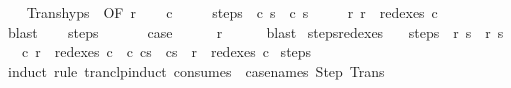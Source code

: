 \begin{isabellebody}
\ \ \isamarkupfalse%
\ Trans{\isachardot}hyps\ {\isacharparenleft}{}{\isacharparenright}\ {\isacharbrackleft}OF\ r{\isacharprime}{\isacharprime}{\isacharbrackright}\isanewline
\ \ \isamarkupfalse%
\ c{\isacharprime}{\isacharprime}\ \isanewline
\ \ \ \ steps{\isacharcolon}\ {\isachardoublequoteopen}{\isasymGamma}{\isasymturnstile}\ {\isacharparenleft}c{\isacharprime}{\isacharcomma}\ s{\isacharprime}{\isacharprime}{\isacharparenright}\ {\isasymrightarrow}\isactrlsup {\isacharasterisk}\ {\isacharparenleft}c{\isacharprime}{\isacharprime}{\isacharcomma}\ s{\isacharprime}{\isacharparenright}{\isachardoublequoteclose}\ \isanewline
\ \ \ \ r{\isacharprime}{\isacharcolon}\ {\isachardoublequoteopen}r{\isacharprime}\ {\isasymin}\ redexes\ c{\isacharprime}{\isacharprime}{\isachardoublequoteclose}\isanewline
\ \ \ \ \isamarkupfalse%
\ blast\isanewline
\ \ \isamarkupfalse%
\ steps\isanewline
\ \ \isamarkupfalse%
\isanewline
\ \ \isamarkupfalse%
\ {\isacharquery}case\isanewline
\ \ \ \ \isamarkupfalse%
\ r{\isacharprime}\isanewline
\ \ \ \ \isamarkupfalse%
\ blast\isanewline
{}\isamarkupfalse%
%
\endisatagproof
{\isafoldproof}%
%
\isadelimproof
\isanewline
%
\endisadelimproof
\isanewline
\isanewline
\isanewline
{}\isamarkupfalse%
\ steps{\isacharunderscore}redexes{\isacharprime}{\isacharcolon}\isanewline
\ \ \ steps{\isacharcolon}\ {\isachardoublequoteopen}{\isasymGamma}{\isasymturnstile}\ {\isacharparenleft}r{\isacharcomma}\ s{\isacharparenright}\ {\isasymrightarrow}\isactrlsup {\isacharplus}\ {\isacharparenleft}r{\isacharprime}{\isacharcomma}\ s{\isacharprime}{\isacharparenright}{\isachardoublequoteclose}\isanewline
\ \ \ {\isachardoublequoteopen}{\isasymAnd}c{\isachardot}\ r\ {\isasymin}\ redexes\ c\ {\isasymLongrightarrow}\ {\isasymexists}c{\isacharprime}{\isachardot}\ {\isasymGamma}{\isasymturnstile}{\isacharparenleft}c{\isacharcomma}s{\isacharparenright}\ {\isasymrightarrow}\isactrlsup {\isacharplus}\ {\isacharparenleft}c{\isacharprime}{\isacharcomma}s{\isacharprime}{\isacharparenright}\ {\isasymand}\ r{\isacharprime}\ {\isasymin}\ redexes\ c{\isacharprime}{\isachardoublequoteclose}\isanewline
%
\isadelimproof
%
\endisadelimproof
%
\isatagproof
{}\isamarkupfalse%
\ steps\ \isanewline
{}\isamarkupfalse%
\ {\isacharparenleft}induct\ rule{\isacharcolon}\ tranclp{\isacharunderscore}induct{}\ {\isacharbrackleft}consumes\ {}{\isacharcomma}\ case{\isacharunderscore}names\ Step\ Trans{\isacharbrackright}{\isacharparenright}\isanewline

\end{isabellebody}
